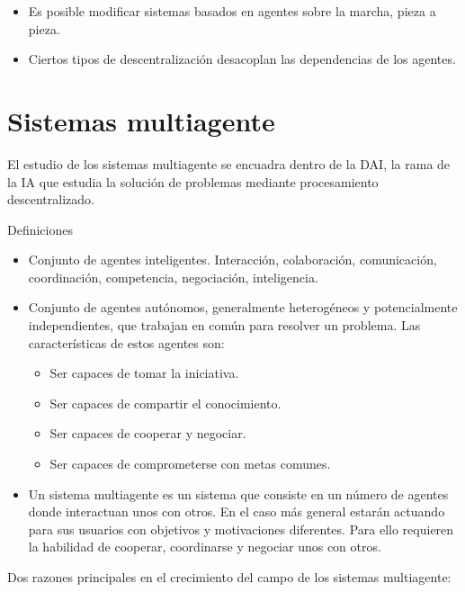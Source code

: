 \begin{itemize}
	\item Es posible modificar sistemas basados en agentes sobre la marcha, pieza a pieza.
	\item Ciertos tipos de descentralización desacoplan las dependencias de los agentes.
\end{itemize}

\section{Sistemas multiagente}

El estudio de los sistemas multiagente se encuadra dentro de la DAI, la rama de la IA que estudia la solución de problemas mediante procesamiento descentralizado.

Definiciones

\begin{itemize}
	\item Conjunto de agentes inteligentes. Interacción, colaboración, comunicación, coordinación, competencia, negociación, inteligencia.
	\item Conjunto de agentes autónomos, generalmente heterogéneos y potencialmente independientes, que trabajan en común para resolver un problema. Las características de estos agentes son:
	\begin{itemize}
		\item Ser capaces de tomar la iniciativa.
		\item Ser capaces de compartir el conocimiento.
		\item Ser capaces de cooperar y negociar.
		\item Ser capaces de comprometerse con metas comunes.
	\end{itemize}
	\item Un sistema multiagente es un sistema que consiste en un número de agentes donde interactuan unos con otros. En el caso más general estarán actuando para sus usuarios con objetivos y motivaciones diferentes. Para ello requieren la habilidad de cooperar, coordinarse y negociar unos con otros.
\end{itemize}

Dos razones principales en el crecimiento del campo de los sistemas multiagente:

